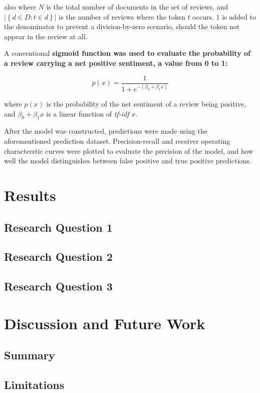 \documentclass[12pt,bibliography=totocnumbered]{scrartcl}
\begin{document}
also where $N$ is the total number of documents in the set of reviews, and
$\left|\left\{d\in D : t\in d\right\}\right|$ is the number of reviews where
the token $t$ occurs. $1$ is added to the denominator to prevent a
division-by-zero scenario, should the token not appear in the review at all.

A conventional \bf{sigmoid function} was used to evaluate the probability
of a review carrying a net positive sentiment, a value from 0 to 1:

\begin{equation}
	p(x) = \frac{1}{1+e^{-{\left(\beta_0+\beta_1x\right)}}}
	\label{eq:sigmoid}
\end{equation}

where $p(x)$ is the probability of the net sentiment of a review being positive, and
$\beta_0+\beta_1x$ is a linear function of \it{tf-idf} $x$.

After the model was constructed, predictions were made using the aforementioned
prediction dataset. Precision-recall and receiver operating characterstic curves
were plotted to evaluate the precision of the model,
and how well the model distinguishes between false positive and true positive predictions.

\section{Results}
\subsection{Research Question 1}
\subsection{Research Question 2}
\subsection{Research Question 3}

\section{Discussion and Future Work}
\subsection{Summary}
\subsection{Limitations}
\end{document}
